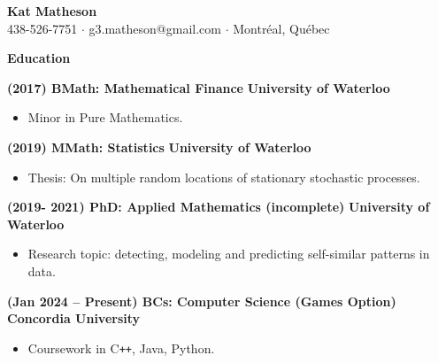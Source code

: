\documentclass[11pt, oneside]{article}   	%
\begin{document}
\thispagestyle{empty}

\begin{center}
\textbf{\Large{Kat Matheson}} \\ \vspace{4pt}  438-526-7751 $\cdot$ g3.matheson@gmail.com $\cdot$ Montr\'eal, Qu\'{e}bec
\end{center}

\vspace{12pt}

\textbf{\large{Education}}

\small

\vspace{4pt}

\textbf{(2017) BMath: Mathematical Finance} \hfill \textbf{University of Waterloo}

\vspace{-8pt}
\begin{itemize}
\item Minor in Pure Mathematics.
\end{itemize}

\vspace{-4pt}

\textbf{(2019) MMath: Statistics} \hfill \textbf{University of Waterloo}

\vspace{-8pt}
\begin{itemize}
\item Thesis: On multiple random locations of stationary stochastic processes.
\end{itemize}

\vspace{-4pt}

\textbf{(2019- 2021) PhD: Applied Mathematics (incomplete)} \hfill \textbf{University of Waterloo}

\vspace{-8pt}
\begin{itemize}
\item Research topic: detecting, modeling and predicting self-similar patterns in data.
\end{itemize}

\vspace{-4pt}

\textbf{(Jan 2024 -- Present) BCs: Computer Science (Games Option)} \hfill \textbf{Concordia University}

\vspace{-8pt}
\begin{itemize}
\item Coursework in C\texttt{++}, Java, Python.
\end{itemize}
\end{document}
